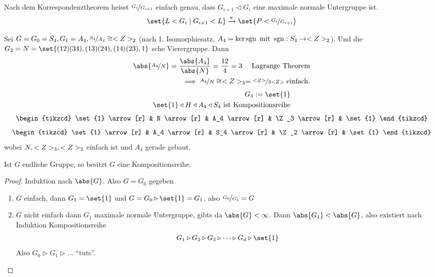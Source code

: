 \begin{*remark}
	Nach dem Korrespondenztheorem heisst $\lnkset{G_i}{G_{i+1}}$ einfach genau, dass $G_{i+1} \lhd G_i$ eine maximale normale Untergruppe ist.
	\begin{align*}
		\set{L < G_i \mid G_{i+1} < L} \xrightarrow{\pi} \set{P < \lnkset{G_i}{G_{i+1}}}
	\end{align*}
\end{*remark}
\begin{example}
	Sei $G=G_0=S_4, G_1 = A_4, \lnkset{S_4}{A_4} \cong \Z_2$ (nach 1. Isomorphiesatz, $A_4 = \ker \operatorname{sgn} \text{ mit } \operatorname{sgn}: S_4 \to <Z>_2$). Und die $G_2 = N = \set{(12)(34),(13)(24),(14)(23),1}$ sche Vierergruppe. Dann
	\begin{align*}
		\abs{\lnkset{A_4}{N}} = \frac{\abs{A_4}}{\abs{N}} = \frac{12}{4} = 3 \quad \text{ Lagrange Theorem}\\
		\implies \lnkset{A_4}{N} \cong \Z_3 = \lnkset{\Z}{3\Z} \text{ einfach.}
	\end{align*}
	\begin{align*}
		G_3:= \set{1}\\
		\set{1} \lhd H \lhd A_4 \lhd S_4 \text{ ist Kompositionsreihe}
	\end{align*}
	\[ %
		\begin{tikzcd}
			\set{1} \arrow[r] & N \arrow[r] & A_4 \arrow[r] & \Z_3 \arrow[r] & \set{1}
		\end{tikzcd}
	\]
	\[
		\begin{tikzcd}
			\set{1} \arrow[r] & A_4 \arrow[r] & S_4 \arrow[r] & \Z_2 \arrow[r] & \set{1}
		\end{tikzcd}
	\]
	wobei $N, <Z>_3, <Z>_2$ einfach ist und $A_4$ gerade gebaut.
\end{example}
\begin{proposition}
	Ist $G$ endliche Gruppe, so besitzt $G$ eine Kompositionsreihe.
\end{proposition}
\begin{proof}
	Induktion nach $\abs{G}$. Also $G = G_0$ gegeben
	\begin{enumerate}
		\item $G$ einfach, dann $G_1 = \set{1}$ und \checkmark $G=G_0 \triangleright \set{1} = G_1$, also $\lnkset{G_0}{G_1} = G$
		\item $G$ nicht einfach dann $G_1$ maximale normale Untergruppe, gibts da $\abs{G} < \infty$. Dann $\abs{G_1}< \abs{G}$, also existiert nach Induktion Kompositionsreihe
		\begin{align*}
			G_1 \triangleright G_2 \triangleright G_3 \triangleright \dots \triangleright G_d \triangleright \set{1}
		\end{align*}
		Also $G_0 \triangleright G_1 \triangleright \dots$ ``tuts''.
	\end{enumerate}
\end{proof}
